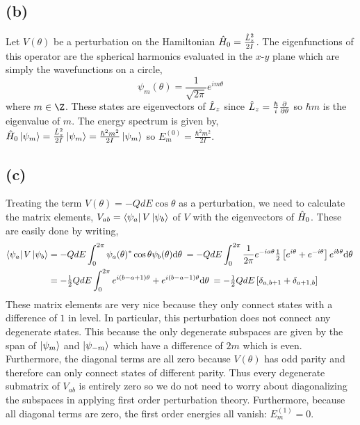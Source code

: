 \documentclass[12pt]{extarticle}
\begin{document}
\subsection*{(b)}

Let $V(\theta)$ be a perturbation on the Hamiltonian $\hat{H}_0 = \frac{\hat{L}_z^2}{2I}$. The eigenfunctions of this operator are the spherical harmonics evaluated in the $x$-$y$ plane which are simply the wavefunctions on a circle, 
\[ \psi_m(\theta) = \frac{1}{\sqrt{2\pi}} e^{i m \theta}\]
where $m \in \Z$. These states are eigenvectors of $\hat{L}_z$ since $\hat{L}_z = \frac{\hbar}{i} \frac{\partial{}}{\partial{\theta}}$ so $\hbar m$ is the eigenvalue of $m$. The energy spectrum is given by, $\hat{H}_0 \left| \psi_m \right> = \frac{\hat{L}_z^2}{2I} \left| \psi_m \right> = \frac{\hbar^2 m^2}{2I} \left| \psi_m \right>$ so $E^{(0)}_m = \frac{\hbar^2 m^2}{2 I}$.

\subsection*{(c)}

Treating the term $V(\theta) = - QdE \cos{\theta}$ as a perturbation, we need to calculate the matrix elements, $V_{ab} = \left< \psi_a \right| V \left| \psi_b \right>$ of $V$ with the eigenvectors of $\hat{H}_0$. These are easily done by writing,
\begin{align*}
\left< \psi_a \right| V \left| \psi_b \right> & = - QdE \int_{0}^{2 \pi} \psi_a(\theta)^* \cos{\theta} \psi_b(\theta) \mathrm{d}\theta \: = -QdE \int_{0}^{2 \pi} \frac{1}{2 \pi} e^{-ia \theta} \tfrac{1}{2} \left[ e^{i \theta} + e^{-i\theta} \right] e^{ib \theta} \mathrm{d}\theta \: \\
& = - \tfrac{1}{2} QdE \int_{0}^{2 \pi} e^{i(b - a + 1) \theta} + e^{i(b - a - 1) \theta} \mathrm{d}\theta \: = - \tfrac{1}{2} QdE \left[ \delta_{a, b + 1} + \delta_{a + 1, b}\right]
\end{align*} 
These matrix elements are very nice because they only connect states with a difference of $1$ in level. In particular, this perturbation does not connect any degenerate states. This because the only degenerate subspaces are given by the span of $\left| \psi_m \right>$ and $\left| \psi_{-m} \right>$ which have a difference of $2m$ which is even. Furthermore, the diagonal terms are all zero because $V(\theta)$ has odd parity and therefore can only connect states of different parity. Thus every degenerate submatrix of $V_{ab}$ is entirely zero so we do not need to worry about diagonalizing the subspaces in applying first order perturbation theory. Furthermore, because all diagonal terms are zero, the first order energies all vanish: $E^{(1)}_m = 0$.  
\end{document}
